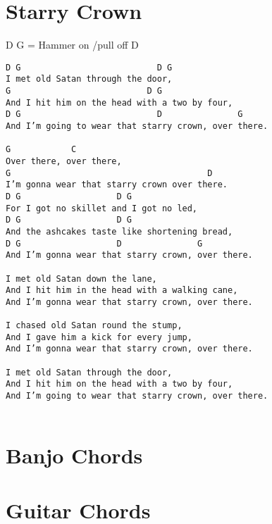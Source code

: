\documentclass[leqno]{memoir}
\begin{document}
\chapter{Starry Crown}
D G = Hammer on /pull off D
\begin{verbatim}
D G                           D G
I met old Satan through the door,
G                           D G
And I hit him on the head with a two by four,
D G                           D               G
And I’m going to wear that starry crown, over there.

G            C
Over there, over there,
G                                       D
I’m gonna wear that starry crown over there.
D G                   D G
For I got no skillet and I got no led,
D G                   D G
And the ashcakes taste like shortening bread,
D G                   D               G
And I’m gonna wear that starry crown, over there.

I met old Satan down the lane,
And I hit him in the head with a walking cane,
And I’m gonna wear that starry crown, over there.

I chased old Satan round the stump,
And I gave him a kick for every jump,
And I’m gonna wear that starry crown, over there.

I met old Satan through the door,
And I hit him on the head with a two by four,
And I’m going to wear that starry crown, over there.


\end{verbatim}
\newpage






\chapter{Banjo Chords}

\newpage
\chapter{Guitar Chords}

\end{document}
